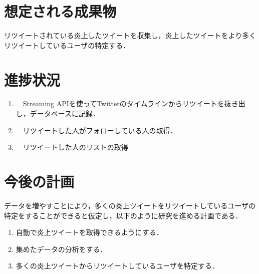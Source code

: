 \documentclass[uplatex,twocolumn,dvipdfmx]{jsarticle}
\begin{document}
\section{想定される成果物}
リツイートされている炎上したツイートを収集し，炎上したツイートをより多くリツイートしているユーザの特定する．
\section{進捗状況}
\begin{enumerate}
  \item　Streaming APIを使ってTwitterのタイムラインからリツイートを抜き出し，データベースに記録．
  \item　リツイートした人がフォローしている人の取得．
  \item　リツイートした人のリストの取得
\end{enumerate}
\section{今後の計画}

データを増やすことにより，多くの炎上ツイートをリツイートしているユーザの特定をすることができると仮定し，以下のように研究を進める計画である．
\begin{enumerate}
 \item 自動で炎上ツイートを取得できるようにする．
 \item 集めたデータの分析をする．
 \item 多くの炎上ツイートからリツイートしているユーザを特定する．
\end{enumerate}


\end{document}
